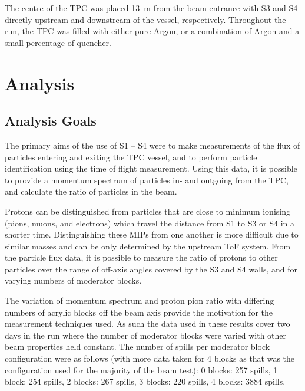 The centre of the TPC was placed 13~m from the beam entrance with S3 and S4 directly upstream and downstream of the vessel, respectively. Throughout the run, the TPC was filled with either pure Argon, or a combination of Argon and a small percentage of quencher.



\section{Analysis}
\subsection{Analysis Goals}
The primary aims of the use of S1 -- S4 were to make measurements of the flux of particles entering and exiting the TPC vessel, and to perform particle identification using the time of flight measurement.
Using this data, it is possible to provide a momentum spectrum of particles in- and outgoing from the TPC, and calculate the ratio of particles in the beam.

Protons can be distinguished from particles that are close to minimum ionising (pions, muons, and electrons) which travel the distance from S1 to S3 or S4 in a shorter time.
Distinguishing these MIPs from one another is more difficult due to similar masses and can be only determined by the upstream ToF system.
From the particle flux data, it is possible to measure the ratio of protons to other particles over the range of off-axis angles covered by the S3 and S4 walls, and for varying numbers of moderator blocks.

The variation of momentum spectrum and proton pion ratio with differing numbers of acrylic blocks off the beam axis provide the motivation for the measurement techniques used.
As such the data used in these results cover two days in the run where the number of moderator blocks were varied with other beam properties held constant.
The number of spills per moderator block configuration were as follows (with more data taken for 4 blocks as that was the configuration used for the majority of the beam test):
0 blocks: 257 spills, 1 block:  254 spills, 2 blocks: 267 spills, 3 blocks: 220 spills, 4 blocks: 3884 spills.


